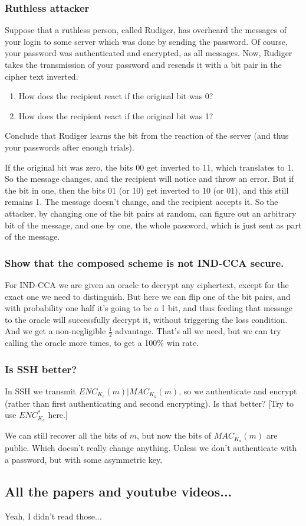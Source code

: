 \documentclass{article}
\begin{document}
  \subsubsection{Ruthless attacker}
  \begin{centerframebox}
    Suppose that a ruthless person, called Rudiger, has overheard the
    messages of your login to some server which was done by sending
    the password. Of course, your password was authenticated and encrypted, as all messages. Now, Rudiger takes the transmission of
    your password and resends it with a bit pair in the cipher text inverted.
    \begin{enumerate}[label=(\alph*)]
      \item How does the recipient react if the original bit was 0?
      \item How does the recipient react if the original bit was 1?
    \end{enumerate}
    Conclude that Rudiger learns the bit from the reaction of the server
    (and thus your passwords after enough trials).
  \end{centerframebox}
  If the original bit was zero, the bits 00 get inverted to 11, which translates to 1.
  So the message changes, and the recipient will notice and throw an error.
  But if the bit in one, then the bits 01 (or 10) get inverted to 10 (or 01), and this still remains 1.
  The message doesn't change, and the recipient accepts it.
  So the attacker, by changing one of the bit pairs at random, can figure out an arbitrary bit of the message,
  and one by one, the whole password, which is just sent as part of the message.

  \subsubsection{Show that the composed scheme is not IND-CCA secure.}
  For IND-CCA we are given an oracle to decrypt any ciphertext, except for the exact one we need to distinguish.
  But here we can flip one of the bit pairs, and with probability one half it's going to be a 1 bit,
  and thus feeding that message to the oracle will successfully decrypt it, without triggering the loss condition.
  And we get a non-negligible $\frac{1}{2}$ advantage.
  That's all we need, but we can try calling the oracle more times, to get a 100\% win rate.

  \subsubsection{Is SSH better?}
  \begin{centerframebox}
    In SSH we transmit $ENC_{K_e}(m) | MAC_{K_a} (m)$, so we authenticate and
    encrypt (rather than first authenticating and second encrypting). Is
    that better? [Try to use $ENC^*_{K_e}$ here.]
  \end{centerframebox}
  We can still recover all the bits of $m$, but now the bits of $MAC_{K_a} (m)$ are public.
  Which doesn't really change anything.
  Unless we don't authenticate with a password, but with some asymmetric key.

  \subsection{All the papers and youtube videos...}
  Yeah, I didn't read those...
\end{document}
